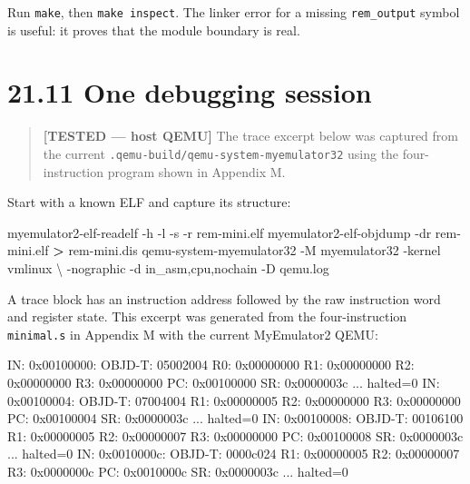 \documentclass[
  oneside,
  openany]{book}
\newenvironment{Shaded}{\begin{snugshade}}{\end{snugshade}}
\newcommand{\AttributeTok}[1]{\textcolor[rgb]{0.13,0.29,0.53}{#1}}
\newcommand{\DataTypeTok}[1]{\textcolor[rgb]{0.13,0.29,0.53}{#1}}
\newcommand{\ExtensionTok}[1]{#1}
\newcommand{\NormalTok}[1]{#1}
\newcommand{\OperatorTok}[1]{\textcolor[rgb]{0.81,0.36,0.00}{\textbf{#1}}}
\begin{document}
Run \texttt{make}, then \texttt{make\ inspect}. The linker error for a
missing \texttt{rem\_output} symbol is useful: it proves that the module
boundary is real.

\hypertarget{one-debugging-session}{%
\section{21.11 One debugging session}\label{one-debugging-session}}

\begin{quote}
\textbf{{[}TESTED --- host QEMU{]}} The trace excerpt below was captured
from the current \texttt{.qemu-build/qemu-system-myemulator32} using the
four-instruction program shown in Appendix M.
\end{quote}

Start with a known ELF and capture its structure:

\begin{Shaded}
\begin{Highlighting}[]
\ExtensionTok{myemulator2{-}elf{-}readelf} \AttributeTok{{-}h} \AttributeTok{{-}l} \AttributeTok{{-}s} \AttributeTok{{-}r}\NormalTok{ rem{-}mini.elf}
\ExtensionTok{myemulator2{-}elf{-}objdump} \AttributeTok{{-}dr}\NormalTok{ rem{-}mini.elf }\OperatorTok{\textgreater{}}\NormalTok{ rem{-}mini.dis}
\ExtensionTok{qemu{-}system{-}myemulator32} \AttributeTok{{-}M}\NormalTok{ myemulator32 }\AttributeTok{{-}kernel}\NormalTok{ vmlinux }\DataTypeTok{\textbackslash{}}
  \AttributeTok{{-}nographic} \AttributeTok{{-}d}\NormalTok{ in\_asm,cpu,nochain }\AttributeTok{{-}D}\NormalTok{ qemu.log}
\end{Highlighting}
\end{Shaded}

A trace block has an instruction address followed by the raw instruction
word and register state. This excerpt was generated from the
four-instruction \texttt{minimal.s} in Appendix M with the current
MyEmulator2 QEMU:

\begin{Shaded}
\begin{Highlighting}[]
\NormalTok{IN:}
\NormalTok{0x00100000:}
\NormalTok{OBJD{-}T: 05002004}
\NormalTok{R0: 0x00000000  R1: 0x00000000  R2: 0x00000000  R3: 0x00000000}
\NormalTok{PC: 0x00100000  SR: 0x0000003c  ... halted=0}
\NormalTok{IN:}
\NormalTok{0x00100004:}
\NormalTok{OBJD{-}T: 07004004}
\NormalTok{R1: 0x00000005  R2: 0x00000000  R3: 0x00000000}
\NormalTok{PC: 0x00100004  SR: 0x0000003c  ... halted=0}
\NormalTok{IN:}
\NormalTok{0x00100008:}
\NormalTok{OBJD{-}T: 00106100}
\NormalTok{R1: 0x00000005  R2: 0x00000007  R3: 0x00000000}
\NormalTok{PC: 0x00100008  SR: 0x0000003c  ... halted=0}
\NormalTok{IN:}
\NormalTok{0x0010000c:}
\NormalTok{OBJD{-}T: 0000c024}
\NormalTok{R1: 0x00000005  R2: 0x00000007  R3: 0x0000000c}
\NormalTok{PC: 0x0010000c  SR: 0x0000003c  ... halted=0}
\end{Highlighting}
\end{Shaded}
\end{document}
